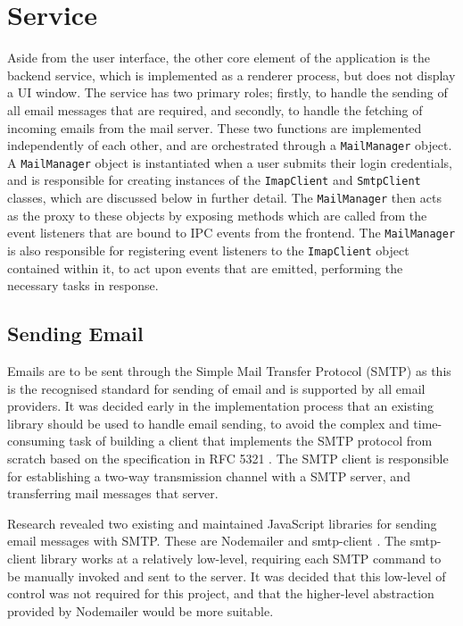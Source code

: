 \section{Service}

Aside from the user interface, the other core element of the application is the backend service, which is implemented as a renderer process, but does not display a UI window. The service has two primary roles; firstly, to handle the sending of all email messages that are required, and secondly, to handle the fetching of incoming emails from the mail server. These two functions are implemented independently of each other, and are orchestrated through a \verb|MailManager| object. A \verb|MailManager| object is instantiated when a user submits their login credentials, and is responsible for creating instances of the \verb|ImapClient| and \verb|SmtpClient| classes, which are discussed below in further detail. The \verb|MailManager| then acts as the proxy to these objects by exposing methods which are called from the event listeners that are bound to IPC events from the frontend. The \verb|MailManager| is also responsible for registering event listeners to the \verb|ImapClient| object contained within it, to act upon events that are emitted, performing the necessary tasks in response.


\subsection{Sending Email}
Emails are to be sent through the Simple Mail Transfer Protocol (SMTP) \cite{smtp-rfc} as this is the recognised standard for sending of email and is supported by all email providers. It was decided early in the implementation process that an existing library should be used to handle email sending, to avoid the complex and time-consuming task of building a client that implements the SMTP protocol from scratch based on the specification in RFC 5321 \cite{smtp-rfc}. The SMTP client is responsible for establishing a two-way transmission channel with a SMTP server, and transferring mail messages that server.

Research revealed two existing and maintained JavaScript libraries for sending email messages with SMTP. These are Nodemailer \cite{nodemailer} and smtp-client \cite{smtp-client}. The smtp-client library works at a relatively low-level, requiring each SMTP command to be manually invoked and sent to the server. It was decided that this low-level of control was not required for this project, and that the higher-level abstraction provided by Nodemailer would be more suitable.

